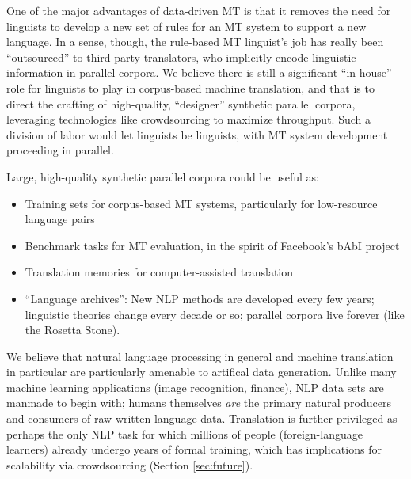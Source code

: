 One of the major advantages of data-driven MT is that it removes the need for linguists to develop a new set of rules for an MT system to support a new language.
In a sense, though, the rule-based MT linguist's job has really been  ``outsourced'' to third-party translators, who implicitly encode linguistic information in parallel corpora.
We believe there is still a significant ``in-house'' role for linguists to play in corpus-based machine translation, and that is to direct the crafting of high-quality, ``designer'' synthetic parallel corpora, leveraging technologies like crowdsourcing to maximize throughput.
Such a division of labor would let linguists be linguists, with MT system development proceeding in parallel.  


\label{subsec:benefits} %

Large, high-quality synthetic parallel corpora could be useful as:

\begin{itemize}
\item Training sets for corpus-based MT systems, particularly for low-resource language pairs
\item Benchmark tasks for MT evaluation, in the spirit of Facebook's bAbI project 
\item Translation memories for computer-assisted translation
\item ``Language archives'': New NLP methods are developed every few years; linguistic theories change every decade or so; parallel corpora live forever (like the Rosetta Stone).
\end{itemize}

We believe that natural language processing in general and machine translation in particular are particularly amenable to artifical data generation. 
Unlike many machine learning applications (image recognition, finance), NLP data sets are manmade to begin with; humans themselves {\em are} the primary natural producers and consumers of raw written language data.
Translation is further privileged as perhaps the only NLP task for which millions of people (foreign-language learners) already undergo years of formal training, which has implications for scalability via crowdsourcing (Section \ref{sec:future}).

